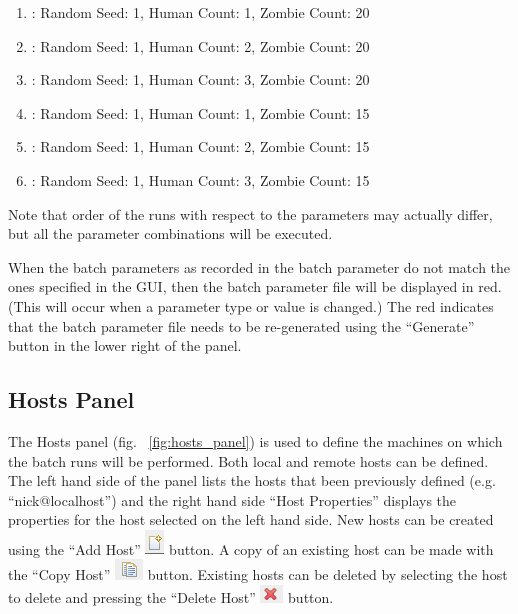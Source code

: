 \documentclass[11pt]{amsart}
\begin{document}
\begin{enumerate}
\item: Random Seed: 1, Human Count: 1, Zombie Count: 20
\item: Random Seed: 1, Human Count: 2, Zombie Count: 20
\item: Random Seed: 1, Human Count: 3, Zombie Count: 20
\item: Random Seed: 1, Human Count: 1, Zombie Count: 15
\item: Random Seed: 1, Human Count: 2, Zombie Count: 15
\item: Random Seed: 1, Human Count: 3, Zombie Count: 15
\end{enumerate}

Note that order of the runs with respect to the parameters may actually differ, but all the parameter combinations will be executed.

When the batch parameters as recorded in the batch parameter do not match the ones specified in the GUI, then the batch parameter file will be displayed in red.  (This will occur when a parameter type or value is changed.) The red indicates that the batch parameter file needs to be re-generated using the ``Generate'' button in the lower right of the panel.

\subsection{Hosts Panel}
The Hosts panel (fig. ~\ref{fig:hosts_panel}) is used to define the machines on which the batch runs will be performed. Both local and remote hosts can be defined. The left hand side of the panel lists the hosts that been previously defined (e.g. ``nick@localhost'') and the right hand side ``Host Properties'' displays the properties for the host selected on the left hand side. New hosts can be created using the ``Add Host'' \includegraphics[height=.2in]{images/add_host.png} button. A copy of an existing host can be made with the ``Copy Host'' \includegraphics[height=.2in]{images/copy_host.png} button. Existing hosts can be deleted by selecting the host to delete and pressing the ``Delete Host'' \includegraphics[height=.2in]{images/delete_host.png} button.
\end{document}
